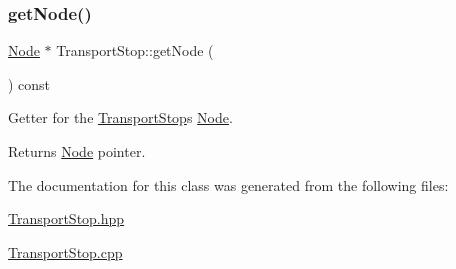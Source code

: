 \subsubsection{\texorpdfstring{get\+Node()}{getNode()}}
{\footnotesize\ttfamily \hyperlink{class_node}{Node} $\ast$ Transport\+Stop\+::get\+Node (\begin{DoxyParamCaption}{ }\end{DoxyParamCaption}) const}

Getter for the \hyperlink{class_transport_stop}{Transport\+Stop}\textquotesingle{}s \hyperlink{class_node}{Node}.

\begin{DoxyReturn}{Returns}
\hyperlink{class_node}{Node} pointer. 
\end{DoxyReturn}


The documentation for this class was generated from the following files\+:\begin{DoxyCompactItemize}
\item 
\hyperlink{_transport_stop_8hpp}{Transport\+Stop.\+hpp}\item 
\hyperlink{_transport_stop_8cpp}{Transport\+Stop.\+cpp}\end{DoxyCompactItemize}
